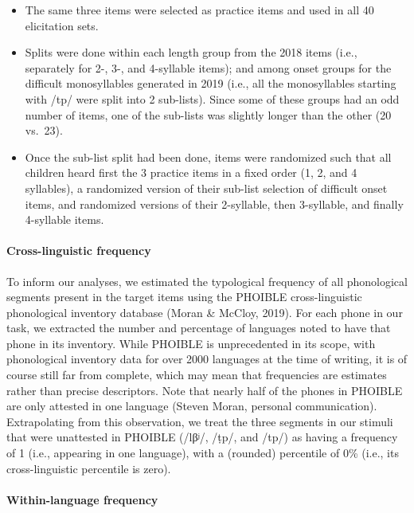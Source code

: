 \documentclass[
  american,
  ,man,floatsintext]{apa6}
\providecommand{\tightlist}{%
  \setlength{\itemsep}{0pt}\setlength{\parskip}{0pt}}
\let\oldparagraph\paragraph
\renewcommand{\paragraph}[1]{\oldparagraph{#1}\mbox{}}
\begin{document}
\begin{itemize}
\tightlist
\item
  The same three items were selected as practice items and used in all 40 elicitation sets.
\item
  Splits were done within each length group from the 2018 items (i.e., separately for 2-, 3-, and 4-syllable items); and among onset groups for the difficult monosyllables generated in 2019 (i.e., all the monosyllables starting with /tp/ were split into 2 sub-lists). Since some of these groups had an odd number of items, one of the sub-lists was slightly longer than the other (20 vs.~23).
\item
  Once the sub-list split had been done, items were randomized such that all children heard first the 3 practice items in a fixed order (1, 2, and 4 syllables), a randomized version of their sub-list selection of difficult onset items, and randomized versions of their 2-syllable, then 3-syllable, and finally 4-syllable items.
\end{itemize}

\hypertarget{cross-linguistic-frequency}{%
\paragraph{Cross-linguistic frequency}\label{cross-linguistic-frequency}}

To inform our analyses, we estimated the typological frequency of all phonological segments present in the target items using the PHOIBLE cross-linguistic phonological inventory database (Moran \& McCloy, 2019). For each phone in our task, we extracted the number and percentage of languages noted to have that phone in its inventory. While PHOIBLE is unprecedented in its scope, with phonological inventory data for over 2000 languages at the time of writing, it is of course still far from complete, which may mean that frequencies are estimates rather than precise descriptors. Note that nearly half of the phones in PHOIBLE are only attested in one language (Steven Moran, personal communication). Extrapolating from this observation, we treat the three segments in our stimuli that were unattested in PHOIBLE (/lβʲ/, /ṭp/, and /tp/) as having a frequency of 1 (i.e., appearing in one language), with a (rounded) percentile of 0\% (i.e., its cross-linguistic percentile is zero).

\hypertarget{within-language-frequency}{%
\paragraph{Within-language frequency}\label{within-language-frequency}}
\end{document}
